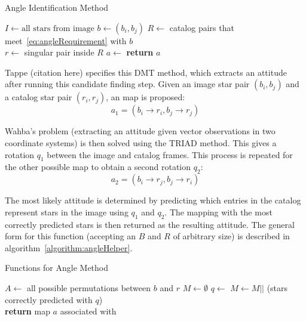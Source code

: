 \begin{algorithm}
    \caption{Angle Identification Method} \label{algorithm:angleIdentification}
    \begin{algorithmic}[1]
        \State $I \gets \text{all stars} \text{ from image}$
        \State $b \gets (b_i, b_j)$
        \State $R \gets $ catalog pairs that meet~\eqref{eq:angleRequirement} with $b$
        \\
        \State $r \gets $ singular pair inside $R$
        \State $a \gets $ 
        \State \textbf{return} $a$
        \EndIf
        \EndFor
        \EndFor
        \EndProcedure
    \end{algorithmic}
\end{algorithm}

Tappe (citation here) specifies this DMT method, which extracts an attitude after running this candidate finding step.
Given an image star pair $(b_i, b_j)$ and a catalog star pair $(r_i, r_j)$, an map is proposed:
\begin{equation}
    a_1 = (b_i \rightarrow r_i, b_j \rightarrow r_j)
\end{equation}

Wahba's problem (extracting an attitude given vector observations in two coordinate systems) is then solved using the
TRIAD method.
This gives a rotation $q_1$ between the image and catalog frames.
This process is repeated for the other possible map to obtain a second rotation $q_2$:
\begin{equation}
    a_2 = (b_i \rightarrow r_j, b_j \rightarrow r_i)
\end{equation}

The most likely attitude is determined by predicting which entries in the catalog represent stars in the image using
$q_1$ and $q_2$.
The mapping with the most correctly predicted stars is then returned as the resulting attitude.
The general form for this function (accepting an $B$ and $R$ of arbitrary size) is described in
algorithm~\ref{algorithm:angleHelper}.

\begin{algorithm}
    \caption{Functions for Angle Method}\label{algorithm:angleHelper}
    \begin{algorithmic}[1]
        \State $A \gets $ all possible permutations between $b$ and $r$
        \State $M \gets \emptyset$
        \State $q \gets $ 
        \State $M \gets M ||$ (stars correctly predicted with $q$)
        \EndFor
        \\
        \State \textbf{return} map $a$ associated with 
        \EndFunction
    \end{algorithmic}
\end{algorithm}

